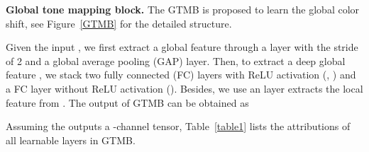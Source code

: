 \documentclass[10pt,twocolumn,letterpaper]{article}
\begin{document}
\begin{table}[ht]
\normalsize 
  \centering
	\caption{Attributions of learnable layers in GTMB.}
	\label{table1}
\end{table}
\textbf{Global tone mapping block.} 
The GTMB is proposed to learn the global color shift, see Figure~\ref{GTMB} for the detailed structure. 
\begin{comment}
Assuming the input is , a   layer with the stride of 2 and a global average pooling (GAP) layer first extract the global feature  from , which can be represented as

where  denotes the GAP. 
Then, two fully connected (FC) with ReLU activation () layers and a FC layer are stacked to output the inner channel attention , which can be represented as

where , denotes the FC, and  denotes the . 
Besides, another   layer extracts the inner feature  from , which can be represented as

After obtaining the  and , the final output of GTMB can be obtained as

\end{comment}
Given the input , we first extract a global feature  through a   layer with the stride of 2 and a global average pooling (GAP) layer.
Then, to extract a deep global feature , we stack two fully connected (FC) layers with ReLU activation (, ) and a FC layer without ReLU activation ().
Besides, we use an   layer extracts the local feature  from .
The output of GTMB can be obtained as

Assuming the  outputs a -channel tensor, Table~\ref{table1} lists the attributions of all learnable layers in GTMB.
\end{document}
